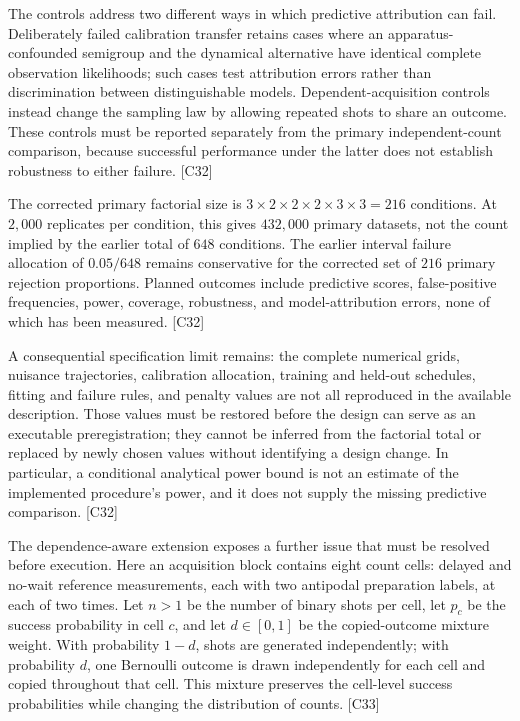 \documentclass[11pt]{article}
\begin{document}
The controls address two different ways in which predictive attribution can fail. Deliberately failed calibration transfer retains cases where an apparatus-confounded semigroup and the dynamical alternative have identical complete observation likelihoods; such cases test attribution errors rather than discrimination between distinguishable models. Dependent-acquisition controls instead change the sampling law by allowing repeated shots to share an outcome. These controls must be reported separately from the primary independent-count comparison, because successful performance under the latter does not establish robustness to either failure. [C32]

The corrected primary factorial size is $3\times2\times2\times2\times3\times3=216$ conditions. At $2{,}000$ replicates per condition, this gives $432{,}000$ primary datasets, not the count implied by the earlier total of $648$ conditions. The earlier interval failure allocation of $0.05/648$ remains conservative for the corrected set of $216$ primary rejection proportions. Planned outcomes include predictive scores, false-positive frequencies, power, coverage, robustness, and model-attribution errors, none of which has been measured. [C32]

A consequential specification limit remains: the complete numerical grids, nuisance trajectories, calibration allocation, training and held-out schedules, fitting and failure rules, and penalty values are not all reproduced in the available description. Those values must be restored before the design can serve as an executable preregistration; they cannot be inferred from the factorial total or replaced by newly chosen values without identifying a design change. In particular, a conditional analytical power bound is not an estimate of the implemented procedure\textquoteright{}s power, and it does not supply the missing predictive comparison. [C32]

The dependence-aware extension exposes a further issue that must be resolved before execution. Here an acquisition block contains eight count cells: delayed and no-wait reference measurements, each with two antipodal preparation labels, at each of two times. Let $n>1$ be the number of binary shots per cell, let $p_c$ be the success probability in cell $c$, and let $d\in[0,1]$ be the copied-outcome mixture weight. With probability $1-d$, shots are generated independently; with probability $d$, one Bernoulli outcome is drawn independently for each cell and copied throughout that cell. This mixture preserves the cell-level success probabilities while changing the distribution of counts. [C33]
\end{document}
